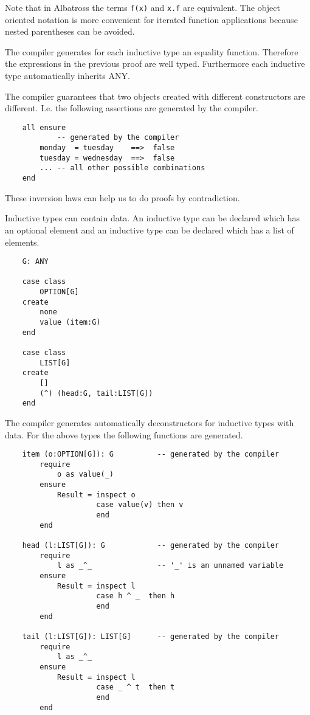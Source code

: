 Note that in Albatross the terms \lstinline!f(x)! and  \lstinline!x.f! are
equivalent. The object oriented notation is more convenient for iterated
function applications because nested parentheses can be avoided.

The compiler generates for each inductive type an equality function. Therefore
the expressions in the previous proof are well typed. Furthermore each
inductive type automatically inherits ANY.

The compiler guarantees that two objects created with different constructors
are different. I.e. the following assertions are generated by the compiler.

\begin{lstlisting}
    all ensure
            -- generated by the compiler
        monday  = tuesday    ==>  false
        tuesday = wednesday  ==>  false
        ... -- all other possible combinations
    end
\end{lstlisting}
These inversion laws can help us to do proofs by contradiction.

Inductive types can contain data. An inductive type can be declared which has
an optional element and an inductive type can be declared which has a list of
elements.

\begin{lstlisting}
    G: ANY

    case class
        OPTION[G]
    create
        none
        value (item:G)
    end

    case class
        LIST[G]
    create
        [] 
        (^) (head:G, tail:LIST[G])
    end
\end{lstlisting}

The compiler generates automatically deconstructors for inductive types with
data. For the above types the following functions are generated.

\begin{lstlisting}
    item (o:OPTION[G]): G          -- generated by the compiler
        require
            o as value(_)
        ensure
            Result = inspect o
                     case value(v) then v
                     end
        end

    head (l:LIST[G]): G            -- generated by the compiler
        require
            l as _^_               -- '_' is an unnamed variable
        ensure
            Result = inspect l
                     case h ^ _  then h
                     end
        end

    tail (l:LIST[G]): LIST[G]      -- generated by the compiler
        require
            l as _^_
        ensure
            Result = inspect l
                     case _ ^ t  then t
                     end
        end
\end{lstlisting}
 
